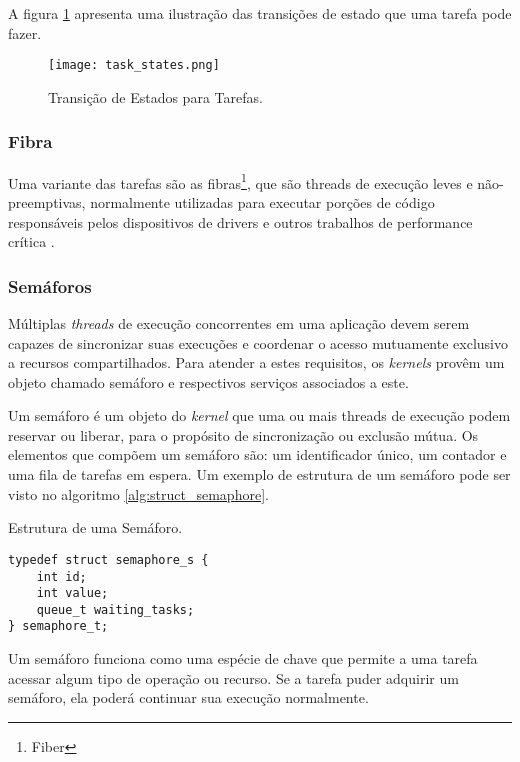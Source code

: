 A figura \ref{fig:tarefa_estados} apresenta uma ilustração das transições de estado que uma tarefa pode fazer.

\begin{figure}[htb]
	\centering
	\texttt{[image: task\_states.png]}
	\caption{Transição de Estados para Tarefas.}
	\label{fig:tarefa_estados}
\end{figure}

\subsubsection{Fibra}

Uma variante das tarefas são as fibras\footnote{Fiber}, que são threads de execução leves e não-preemptivas, normalmente utilizadas para executar porções de código responsáveis pelos dispositivos de drivers e outros trabalhos de performance crítica \cite{rocket}.

\subsubsection{Semáforos}

Múltiplas \emph{threads} de execução concorrentes em uma aplicação devem serem capazes de sincronizar suas execuções e coordenar o acesso mutuamente exclusivo a recursos compartilhados. Para atender a estes requisitos, os \emph{kernels} provêm um objeto chamado semáforo e respectivos serviços associados a este.

Um semáforo é um objeto do \emph{kernel} que uma ou mais threads de execução podem reservar ou liberar, para o propósito de sincronização ou exclusão mútua. Os elementos que compõem um semáforo são: um identificador único, um contador e uma fila de tarefas em espera. Um exemplo de estrutura de um semáforo pode ser visto no algoritmo \ref{alg:struct_semaphore}.

\begin{listing}
	\caption{Estrutura de uma Semáforo.}
	\label{alg:struct_semaphore}
	\centering
	\begin{verbatim}
typedef struct semaphore_s {
	int id;
	int value;
	queue_t waiting_tasks;
} semaphore_t;
	\end{verbatim}
\end{listing}

Um semáforo funciona como uma espécie de chave que permite a uma tarefa acessar algum tipo de operação ou recurso. Se a tarefa puder adquirir um semáforo, ela poderá continuar sua execução normalmente.

